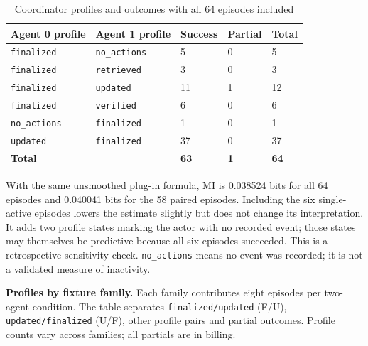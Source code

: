 \documentclass[12pt,a4paper,oneside]{report}
\begin{document}
\begin{table}[htbp]
\centering
\small
\setlength{\tabcolsep}{4pt}
\begin{tabularx}{\linewidth}{|Y|Y|Y|Y|Y|}
\hline
\textbf{Agent 0 profile} & \textbf{Agent 1 profile} & \textbf{Success} & \textbf{Partial} & \textbf{Total} \\
\hline
\texttt{finalized} & \texttt{no\allowbreak\_actions} & 5 & 0 & 5 \\
\hline
\texttt{finalized} & \texttt{retrieved} & 3 & 0 & 3 \\
\hline
\texttt{finalized} & \texttt{updated} & 11 & 1 & 12 \\
\hline
\texttt{finalized} & \texttt{verified} & 6 & 0 & 6 \\
\hline
\texttt{no\allowbreak\_actions} & \texttt{finalized} & 1 & 0 & 1 \\
\hline
\texttt{updated} & \texttt{finalized} & 37 & 0 & 37 \\
\hline
\textbf{Total} &  & \textbf{63} & \textbf{1} & \textbf{64} \\
\hline
\end{tabularx}
\caption{Coordinator profiles and outcomes with all 64 episodes included}
\end{table}
With the same unsmoothed plug-in formula, MI is 0.038524 bits for all 64 episodes and 0.040041 bits for the 58 paired episodes. Including the six single-active episodes lowers the estimate slightly but does not change its interpretation. It adds two profile states marking the actor with no recorded event; those states may themselves be predictive because all six episodes succeeded. This is a retrospective sensitivity check. \texttt{no\allowbreak\_actions} means no event was recorded; it is not a validated measure of inactivity.

\textbf{Profiles by fixture family.} Each family contributes eight episodes per two-agent condition. The table separates \texttt{finalized/updated} (F/U), \texttt{updated/finalized} (U/F), other profile pairs and partial outcomes. Profile counts vary across families; all partials are in billing.
\end{document}
